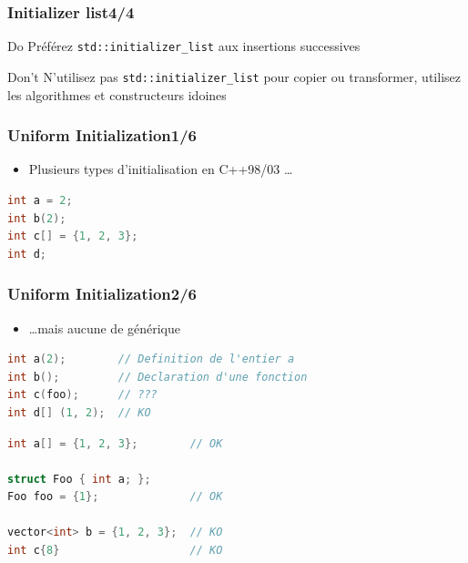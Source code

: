 \documentclass[C++.tex]{subfiles}
\begin{document}
\begin{frame}[fragile]
\frametitle{Initializer list\titlehfill{}4/4}
	\begin{exampleblock}{Do}
		Préférez \lstinline|std::initializer_list| aux insertions successives
	\end{exampleblock}

	\pause

	\begin{alertblock}{Don't}
		N'utilisez pas \lstinline|std::initializer_list| pour copier ou transformer, utilisez les algorithmes et constructeurs idoines

	\end{alertblock}
\end{frame}

\begin{frame}[fragile]
	\frametitle{Uniform Initialization\titlehfill{}1/6}
	\begin{itemize}
		\item Plusieurs types d'initialisation en C++98/03 \ldots
	\end{itemize}

	\begin{lstlisting}[language=C++]
int a = 2;
int b(2);
int c[] = {1, 2, 3};
int d;\end{lstlisting}
\end{frame}

\begin{frame}[fragile]
	\frametitle{Uniform Initialization\titlehfill{}2/6}
	\begin{itemize}
		\item \ldots{}mais aucune de générique
	\end{itemize}

	\begin{lstlisting}[language=C++]
int a(2);        // Definition de l'entier a
int b();         // Declaration d'une fonction
int c(foo);      // ???
int d[] (1, 2);  // KO\end{lstlisting}


	\pause

	\begin{lstlisting}[language=C++]
int a[] = {1, 2, 3};        // OK

struct Foo { int a; };
Foo foo = {1};              // OK

vector<int> b = {1, 2, 3};  // KO
int c{8}                    // KO\end{lstlisting}

\end{frame}
\end{document}
